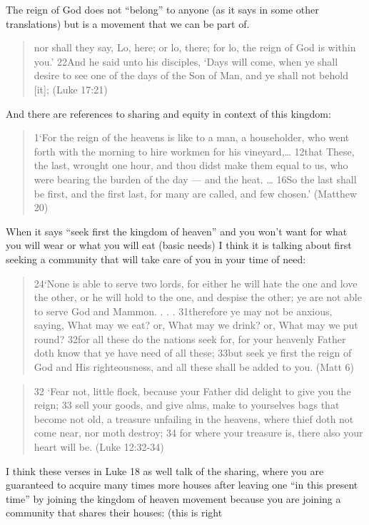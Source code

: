 \documentclass[11pt]{article}
\begin{document}
The reign of God does not “belong” to anyone (as it says in some other translations) but is a movement that we can be part of.
\begin{quote}
nor shall they say, Lo, here; or lo, there; for lo, the reign of God is within you.’ 22And he said unto his disciples, ‘Days will come, when ye shall desire to see one of the days of the Son of Man, and ye shall not behold [it]; (Luke 17:21)
\end{quote}

And there are references to sharing and equity in context of this kingdom:
\begin{quote}
1‘For the reign of the heavens is like to a man, a householder, who went forth with the morning to hire workmen for his vineyard,… 12that These, the last, wrought one hour, and thou didst make them equal to us, who were bearing the burden of the day — and the heat. … 16So the last shall be first, and the first last, for many are called, and few chosen.’ (Matthew 20)
\end{quote}
When it says “seek first the kingdom of heaven” and you won’t want for what you will wear or what you will eat (basic needs) I think it is talking about first seeking a community that will take care of you in your time of need:
\begin{quote}
24‘None is able to serve two lords, for either he will hate the one and love the other, or he will hold to the one, and despise the other; ye are not able to serve God and Mammon. . . . 31therefore ye may not be anxious, saying, What may we eat? or, What may we drink? or, What may we put round? 32for all these do the nations seek for, for your heavenly Father doth know that ye have need of all these; 33but seek ye first the reign of God and His righteousness, and all these shall be added to you. (Matt 6)
\end{quote}
\begin{quote}
32 `Fear not, little flock, because your Father did delight to give you the reign; 33 sell your goods, and give alms, make to yourselves bags that become not old, a treasure unfailing in the heavens, where thief doth not come near, nor moth destroy; 34 for where your treasure is, there also your heart will be. (Luke 12:32-34)
\end{quote}
I think these verses in Luke 18 as well talk of the sharing, where you
are guaranteed to acquire many times more houses after leaving one “in
this present time” by joining the kingdom of heaven movement because
you are joining a community that shares their houses: (this is right
\end{document}
